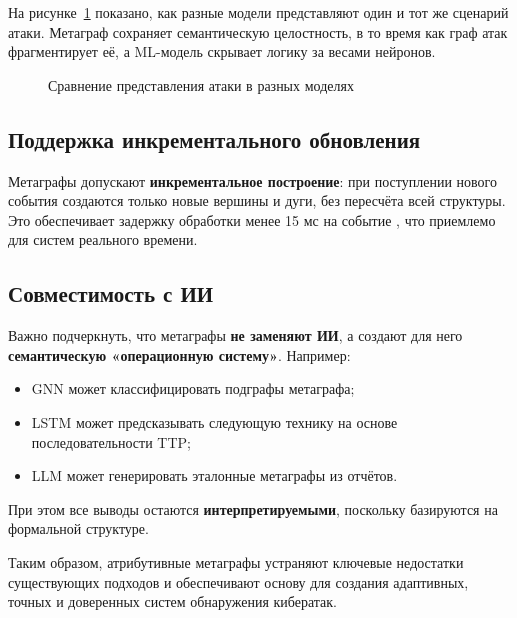 На рисунке~\ref{fig:model_comparison} показано, как разные модели представляют один и тот же сценарий атаки. Метаграф сохраняет семантическую целостность, в то время как граф атак фрагментирует её, а ML-модель скрывает логику за весами нейронов.

\begin{figure}[h]
\centering
{}
\caption{Сравнение представления атаки в разных моделях}
\label{fig:model_comparison}
\end{figure}

\subsection{Поддержка инкрементального обновления}

Метаграфы допускают \textbf{инкрементальное построение}: при поступлении нового события создаются только новые вершины и дуги, без пересчёта всей структуры. Это обеспечивает задержку обработки менее 15 мс на событие \cite{Latypov2020}, что приемлемо для систем реального времени.

\subsection{Совместимость с ИИ}

Важно подчеркнуть, что метаграфы \textbf{не заменяют ИИ}, а создают для него \textbf{семантическую «операционную систему»}. Например:
\begin{itemize}
    \item GNN может классифицировать подграфы метаграфа;
    \item LSTM может предсказывать следующую технику на основе последовательности TTP;
    \item LLM может генерировать эталонные метаграфы из отчётов.
\end{itemize}
    При этом все выводы остаются \textbf{интерпретируемыми}, поскольку базируются на формальной структуре.

Таким образом, атрибутивные метаграфы устраняют ключевые недостатки существующих подходов и обеспечивают основу для создания адаптивных, точных и доверенных систем обнаружения кибератак.
